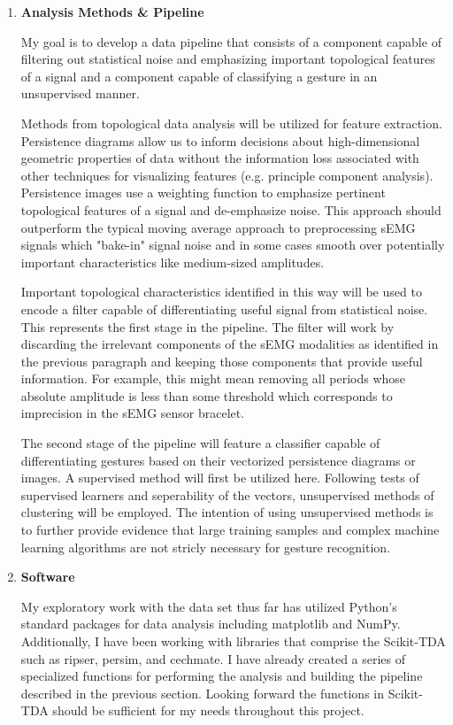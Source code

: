 \documentclass[11pt]{article}
\begin{document}
\begin{enumerate}
\item \textbf{Analysis Methods \& Pipeline}

My goal is to develop a data pipeline that consists of a component capable of filtering out statistical noise and emphasizing important topological features of a signal and a component capable of classifying a gesture in an unsupervised manner.

Methods from topological data analysis will be utilized for feature extraction. Persistence diagrams allow us to inform decisions about high-dimensional geometric properties of data without the information loss associated with other techniques for visualizing features (e.g. principle component analysis). Persistence images use a weighting function to emphasize pertinent topological features of a signal and de-emphasize noise. This approach should outperform the typical moving average approach \cite{state} to preprocessing sEMG signals which "bake-in" signal noise and in some cases smooth over potentially important characteristics like medium-sized amplitudes.

Important topological characteristics identified in this way will be used to encode a filter capable of differentiating useful signal from statistical noise. This represents the first stage in the pipeline. The filter will work by discarding the irrelevant components of the sEMG modalities as identified in the previous paragraph and keeping those components that provide useful information. For example, this might mean removing all periods whose absolute amplitude is less than some threshold which corresponds to imprecision in the sEMG sensor bracelet.

The second stage of the pipeline will feature a classifier capable of differentiating gestures based on their vectorized persistence diagrams or images. A supervised method will first be utilized here. Following tests of supervised learners and seperability of the vectors, unsupervised methods of clustering will be employed. The intention of using unsupervised methods is to further provide evidence that large training samples and complex machine learning algorithms are not stricly necessary for gesture recognition.

\item \textbf{Software}

My exploratory work with the data set thus far has utilized Python's standard packages for data analysis including matplotlib and NumPy. Additionally, I have been working with libraries that comprise the Scikit-TDA such as ripser, persim, and cechmate. I have already created a series of specialized functions for performing the analysis and building the pipeline described in the previous section. Looking forward the functions in Scikit-TDA should be sufficient for my needs throughout this project.


\end{enumerate}
\end{document}
